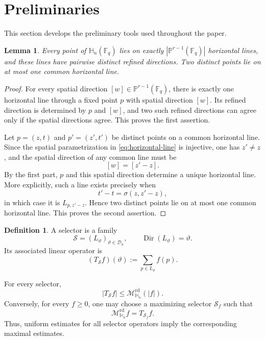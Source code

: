 \documentclass[11pt,letterpaper]{amsart}
\numberwithin{equation}{section}
\newtheorem{lemma}[lemma]{Lemma}
\theoremstyle{definition}
\newtheorem{definition}[definition]{Definition}
\theoremstyle{remark}
\newcommand{\Fq}{\mathbb F_q}
\newcommand{\PP}{\mathbb P}
\newcommand{\HH}{\mathbb H}
\newcommand{\Dn}{\mathcal D_n}
\newcommand{\Mrd}{\mathcal M^{\mathrm{rd}}_{\HH_n}}
\newcommand{\Dir}{\operatorname{Dir}}
\begin{document}
\section{Preliminaries}
\label{sec:preliminaries}
This section develops the preliminary tools used throughout
the paper.
\begin{lemma}\label{lem:line-geometry}
Every point of $\HH_n(\Fq)$ lies on exactly $|\PP^{r-1}(\Fq)|$ horizontal lines, and these lines have pairwise distinct refined directions. Two distinct points lie on at most one common horizontal line.
\end{lemma}

\begin{proof}
For every spatial direction $[w]\in\PP^{r-1}(\Fq)$, there is exactly one horizontal line through a fixed point $p$ with spatial direction $[w]$. Its refined direction is determined by $p$ and $[w]$, and two such refined directions can agree only if the spatial directions agree.  This proves the first assertion.

Let $p=(z,t)$ and $p'=(z',t')$ be distinct points on a common
horizontal line. Since the spatial parametrization in
\eqref{eq:horizontal-line} is injective, one has $z'\neq z$, and the
spatial direction of any common line must be
\[
 [w]=[z'-z].
\]
By the first part, $p$ and this spatial direction determine a unique
horizontal line. More explicitly, such a line exists precisely when
\[
 t'-t=\sigma(z,z'-z),
\]
in which case it is $L_{p,z'-z}$. Hence two distinct points lie on at most one common horizontal line. This proves the second assertion.

\end{proof}

\begin{definition}
A selector is a family
\[
 \mathcal S=(L_\vartheta)_{\vartheta\in\Dn},
 \qquad
 \Dir(L_\vartheta)=\vartheta.
\]
Its associated linear operator is
\begin{equation}\label{eq:selector}
 (T_{\mathcal S}f)(\vartheta)
 :=
 \sum_{p\in L_\vartheta}f(p).
\end{equation}
\end{definition}


For every selector,
\begin{equation}\label{eq:selector-dominated}
 |T_{\mathcal S}f|\leq\Mrd(|f|).
\end{equation}
Conversely, for every $f\geq0$, one may choose a maximizing selector
$\mathcal S_f$ such that
\begin{equation}\label{eq:max-selector}
 \Mrd f=T_{\mathcal S_f}f.
\end{equation}
Thus, uniform estimates for all selector operators imply the corresponding maximal estimates.
\end{document}
